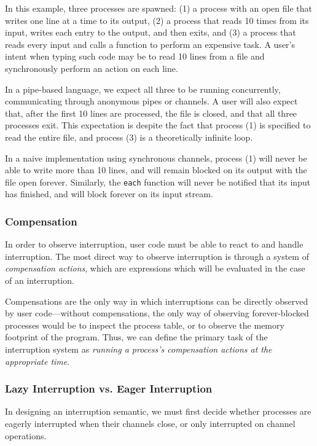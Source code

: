 \documentclass[english,preprint,JIP,uplatex]{ipsj}
\begin{document}
\noindent
In this example, three processes are spawned: (1) a process with an open file that writes one line at a time to its output, (2) a process that reads 10 times from its input, writes each entry to the output, and then exits, and (3) a process that reads every input and calls a function to perform an expensive task.
A user's intent when typing such code may be to read 10 lines from a file and synchronously perform an action on each line.

In a pipe-based language, we expect all three to be running concurrently, communicating through anonymous pipes or channels.
A user will also expect that, after the first 10 lines are processed, the file is closed, and that all three processes exit.
This expectation is despite the fact that process (1) is specified to read the entire file, and process (3) is a theoretically infinite loop.

In a naive implementation using synchronous channels, process (1) will never be able to write more than 10 lines, and will remain blocked on its output with the file open forever.
Similarly, the \verb/each/ function will never be notified that its input has finished, and will block forever on its input stream.

\subsubsection{Compensation}\noindent
In order to observe interruption, user code must be able to react to and handle interruption. The most direct way to observe interruption is through a system of \emph{compensation actions}, which are expressions which will be evaluated in the case of an interruption.

Compensations are the only way in which interruptions can be directly observed by user code---without compensations, the only way of observing forever-blocked processes would be to inspect the process table, or to observe the memory footprint of the program. Thus, we can define the primary task of the interruption system as \emph{running a process's compensation actions at the appropriate time}.

\subsubsection{Lazy Interruption vs. Eager Interruption}\label{lazy-interruption}\noindent
In designing an interruption semantic, we must first decide whether processes are eagerly interrupted when their channels close, or only interrupted on channel operations.
\end{document}
